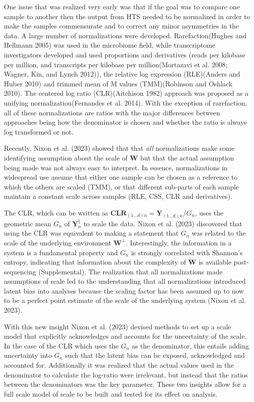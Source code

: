 \documentclass[
]{article}
\begin{document}
One issue that was realized very early was that if the goal was to
compare one sample to another then the output from HTS needed to be
normalized in order to make the samples commensurate and to correct any
minor asymmetries in the data. A large number of normalizations were
developed. Rarefaction(Hughes and Hellmann 2005) was used in the
microbiome field, while transcriptome investigators developed and used
proportions and derivatives (reads per kilobase per million, and
transcripts per kilobase per million(Mortazavi et al. 2008; Wagner, Kin,
and Lynch 2012)), the relative log expression (RLE)(Anders and Huber
2010) and trimmed mean of M values (TMM)(Robinson and Oshlack 2010). The
centered log ratio (CLR)(Aitchison 1982) approach was proposed as a
unifying normalization(Fernandes et al. 2014). With the exception of
rarefaction, all of these normalizations are ratios with the major
differences between approaches being how the denominator is chosen and
whether the ratio is always log transformed or not.

Recently, Nixon et al. (2023) showed that that \emph{all} normalizations
make some identifying assumption about the scale of \(\mathbf{W}\) but
that the actual assumption being made was not always easy to interpret.
In essence, normalizations in widespread use assume that either one
sample can be chosen as a reference to which the others are scaled
(TMM), or that different sub-parts of each sample maintain a constant
scale across samples (RLE, CSS, CLR and derivatives).

The CLR, which can be written as
\(\mathbf{CLR}_{(1...d)n} = \mathbf{Y}_{(1...d)n} / G_n\), uses the
geometric mean \(G_n\) of \(\mathbf{Y}^{\parallel}_{n}\) to scale the
data. Nixon et al. (2023) discovered that using the CLR was equivalent
to making a statement that \(G_n\) was related to the scale of the
underlying environment \(\mathbf{W}^{\perp}\). Interestingly, the
information in a system is a fundamental property and \(G_n\) is
strongly correlated with Shannon's entropy, indicating that information
about the complexity of \(\mathbf{W}\) is available post-sequencing
(Supplemental). The realization that all normalizations made assumptions
of scale led to the understanding that all normalizations introduced
latent bias into analyses because the scaling factor has been assumed up
to now to be a perfect point estimate of the scale of the underlying
system (Nixon et al. 2023).

With this new insight Nixon et al. (2023) devised methods to set up a
scale model that explicitly acknowledges and accounts for the
uncertainty of the scale. In the case of the CLR which uses the \(G_n\)
as the denominator, this entails adding uncertainty into \(G_n\) such
that the latent bias can be exposed, acknowledged and accounted for.
Additionally it was realized that the actual values used in the
denominator to calculate the log-ratio were irrelevant, but instead that
the ratios between the denominators was the key parameter. These two
insights allow for a full scale model of scale to be built and tested
for its effect on analysis.
\end{document}
